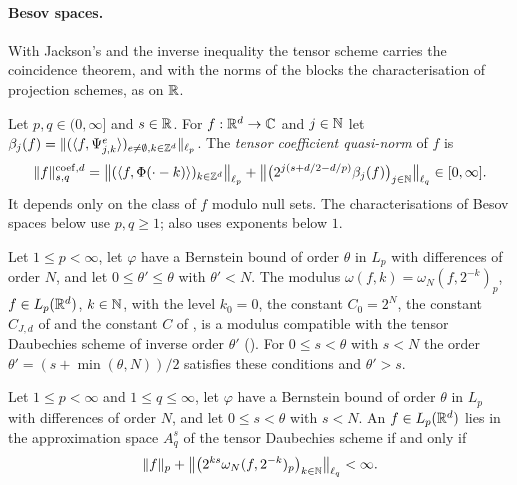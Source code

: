 \paragraph{Besov spaces.}
With Jackson's and the inverse inequality the tensor scheme carries the coincidence theorem, and
with the norms of the blocks the characterisation of projection schemes, as on $\mathbb{R}$.

\begin{definition}
\label{def:daub-rd-coeff-norm}
\leanok
{}
Let $p, q \in (0, \infty]$ and $s \in \mathbb{R}$. For $f : \mathbb{R}^d \to \mathbb{C}$ and $j \in \mathbb{N}$ let
$\beta_j(f) = \|(\langle f, \Psi^e_{j,k} \rangle)_{e \neq \emptyset, k \in \mathbb{Z}^d}\|_{\ell_p}$. The
\emph{tensor coefficient quasi-norm} of $f$ is
\[
  \|f\|^{\mathrm{coef},d}_{s,q}
  = \bigl\|(\langle f, \Phi(\cdot - k) \rangle)_{k \in \mathbb{Z}^d}\bigr\|_{\ell_p}
  + \bigl\|\bigl(2^{j(s + d/2 - d/p)} \beta_j(f)\bigr)_{j \in \mathbb{N}}\bigr\|_{\ell_q}
  \in [0, \infty] .
\]
It depends only on the class of $f$ modulo null sets. The characterisations of Besov spaces
below use $p, q \geq 1$;  also uses exponents below $1$.
\end{definition}

\begin{definition}
\label{def:daub-rd-modulus-data}
\leanok
{}
Let $1 \leq p < \infty$, let $\varphi$ have a Bernstein bound of order $\theta$ in $L_p$ with
differences of order $N$, and let $0 \leq \theta' \leq \theta$ with $\theta' < N$. The modulus
$\omega(f, k) = \omega_N(f, 2^{-k})_p$, $f \in L_p(\mathbb{R}^d)$, $k \in \mathbb{N}$, with the level $k_0 = 0$,
the constant $C_0 = 2^N$, the constant $C_{J,d}$ of  and the
constant $C$ of , is a modulus compatible with the tensor Daubechies
scheme of inverse order $\theta'$ (). For $0 \leq s < \theta$ with $s < N$
the order $\theta' = (s + \min(\theta, N))/2$ satisfies these conditions and $\theta' > s$.
\end{definition}

\begin{theorem}
\label{thm:daub-rd-approx-modulus}
\leanok
{}
Let $1 \leq p < \infty$ and $1 \leq q \leq \infty$, let $\varphi$ have a Bernstein bound of order
$\theta$ in $L_p$ with differences of order $N$, and let $0 \leq s < \theta$ with $s < N$. An
$f \in L_p(\mathbb{R}^d)$ lies in the approximation space $A^s_q$ of the tensor Daubechies scheme if and
only if
\[
  \|f\|_p + \bigl\|\bigl(2^{ks} \omega_N(f, 2^{-k})_p\bigr)_{k \in \mathbb{N}}\bigr\|_{\ell_q} < \infty .
\]
\end{theorem}

